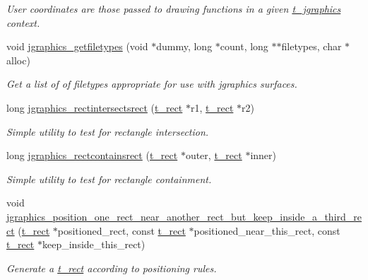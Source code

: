 \begin{DoxyCompactItemize}
\begin{DoxyCompactList}\small\item\em User coordinates are those passed to drawing functions in a given \hyperlink{group__jgraphics_ga4bf27bd7e21a59a427481b909d4656e7}{t\_\-jgraphics} context. \item\end{DoxyCompactList}\item 
void \hyperlink{group__jgraphics_ga7a23d1cdfe75bfcdb0415adc6696f4f0}{jgraphics\_\-getfiletypes} (void $\ast$dummy, long $\ast$count, long $\ast$$\ast$filetypes, char $\ast$alloc)
\begin{DoxyCompactList}\small\item\em Get a list of of filetypes appropriate for use with jgraphics surfaces. \item\end{DoxyCompactList}\item 
long \hyperlink{group__jgraphics_gaa8e30eaa2c74766b0c7ef3977fd8a06c}{jgraphics\_\-rectintersectsrect} (\hyperlink{structt__rect}{t\_\-rect} $\ast$r1, \hyperlink{structt__rect}{t\_\-rect} $\ast$r2)
\begin{DoxyCompactList}\small\item\em Simple utility to test for rectangle intersection. \item\end{DoxyCompactList}\item 
long \hyperlink{group__jgraphics_gaabca7cb7d45c92e788456a2d7dbfd4f6}{jgraphics\_\-rectcontainsrect} (\hyperlink{structt__rect}{t\_\-rect} $\ast$outer, \hyperlink{structt__rect}{t\_\-rect} $\ast$inner)
\begin{DoxyCompactList}\small\item\em Simple utility to test for rectangle containment. \item\end{DoxyCompactList}\item 
void \hyperlink{group__jgraphics_ga5b4eb24b41c116e3324b2da40541f8eb}{jgraphics\_\-position\_\-one\_\-rect\_\-near\_\-another\_\-rect\_\-but\_\-keep\_\-inside\_\-a\_\-third\_\-rect} (\hyperlink{structt__rect}{t\_\-rect} $\ast$positioned\_\-rect, const \hyperlink{structt__rect}{t\_\-rect} $\ast$positioned\_\-near\_\-this\_\-rect, const \hyperlink{structt__rect}{t\_\-rect} $\ast$keep\_\-inside\_\-this\_\-rect)
\begin{DoxyCompactList}\small\item\em Generate a \hyperlink{structt__rect}{t\_\-rect} according to positioning rules. \item\end{DoxyCompactList}\end{DoxyCompactItemize}


